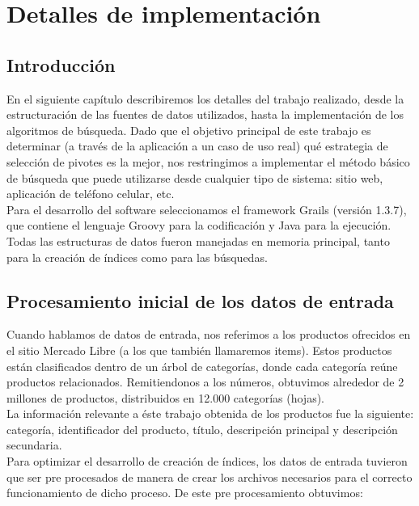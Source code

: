 \chapter{Detalles de implementaci\'on}

\section{Introducci\'on}

En el siguiente cap\'itulo describiremos los detalles del trabajo realizado, desde la estructuraci\'on de las fuentes de datos utilizados, hasta la implementaci\'on de los algoritmos de b\'usqueda. Dado que el objetivo principal de este trabajo es determinar (a trav\'es de la aplicaci\'on a un caso de uso real) qu\'e estrategia de selecci\'on de pivotes es la mejor, nos restringimos a implementar el m\'etodo b\'asico de b\'usqueda que puede utilizarse desde cualquier tipo de sistema: sitio web, aplicaci\'on de tel\'efono celular, etc.\\

Para el desarrollo del software seleccionamos el framework Grails (versi\'on 1.3.7), que contiene el lenguaje Groovy para la codificaci\'on y Java para la ejecuci\'on.\\

Todas las estructuras de datos fueron manejadas en memoria principal, tanto para la creaci\'on de \'indices como para las b\'usquedas.


\section{Procesamiento inicial de los datos de entrada} \label{proc-inic}

Cuando hablamos de datos de entrada, nos referimos a los productos ofrecidos en el sitio Mercado Libre (a los que tambi\'en llamaremos items). Estos productos est\'an clasificados dentro de un \'arbol de categor\'ias, donde cada categor\'ia re\'une productos relacionados. Remitiendonos a los n\'umeros, obtuvimos alrededor de 2 millones de productos, distribuidos en 12.000 categor\'ias (hojas).\\

La informaci\'on relevante a \'este trabajo obtenida de los productos fue la siguiente: categor\'ia, identificador del producto, t\'itulo, descripci\'on principal y descripci\'on secundaria.\\

Para optimizar el desarrollo de creaci\'on de \'indices, los datos de entrada tuvieron que ser pre procesados de manera de crear los archivos necesarios para el correcto funcionamiento de dicho proceso. De este pre procesamiento obtuvimos:

